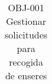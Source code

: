 \begin{table}[H]
\begin{tabular}{|l|l|}
\end{tabular}
\caption{OBJ-001 Gestionar solicitudes para recogida de enseres}
\end{table}
